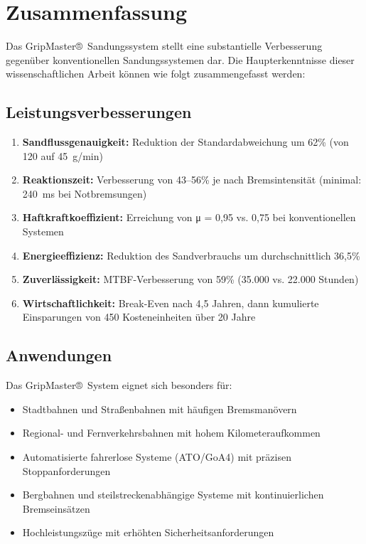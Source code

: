 \documentclass[a4paper,12pt]{article}
\theoremstyle{definition}
\begin{document}
\section{Zusammenfassung}

Das GripMaster®~Sandungssystem stellt eine substantielle Verbesserung gegenüber konventionellen Sandungssystemen dar. Die Haupterkenntnisse dieser wissenschaftlichen Arbeit können wie folgt zusammengefasst werden:

\subsection{Leistungsverbesserungen}

\begin{enumerate}
	\item \textbf{Sandflussgenauigkeit:} Reduktion der Standardabweichung um 62\% (von 120 auf 45~g/min)
	\item \textbf{Reaktionszeit:} Verbesserung von 43--56\% je nach Bremsintensität (minimal: 240~ms bei Notbremsungen)
	\item \textbf{Haftkraftkoeffizient:} Erreichung von μ = 0,95 vs. 0,75 bei konventionellen Systemen
	\item \textbf{Energieeffizienz:} Reduktion des Sandverbrauchs um durchschnittlich 36,5\%
	\item \textbf{Zuverlässigkeit:} MTBF-Verbesserung von 59\% (35.000 vs. 22.000 Stunden)
	\item \textbf{Wirtschaftlichkeit:} Break-Even nach 4,5 Jahren, dann kumulierte Einsparungen von 450 Kosteneinheiten über 20 Jahre
\end{enumerate}

\subsection{Anwendungen}

Das GripMaster®~System eignet sich besonders für:
\begin{itemize}
	\item Stadtbahnen und Straßenbahnen mit häufigen Bremsmanövern
	\item Regional- und Fernverkehrsbahnen mit hohem Kilometeraufkommen
	\item Automatisierte fahrerlose Systeme (ATO/GoA4) mit präzisen Stoppanforderungen
	\item Bergbahnen und steilstreckenabhängige Systeme mit kontinuierlichen Bremseinsätzen
	\item Hochleistungszüge mit erhöhten Sicherheitsanforderungen
\end{itemize}
\end{document}
